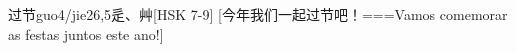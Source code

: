 \begin{EntryWithPhonetic}{过节}{guo4/jie2}{6,5}{⾡、⾋}[HSK 7-9]
  [今年我们一起过节吧！===Vamos comemorar as festas juntos este ano!]
\end{EntryWithPhonetic}
